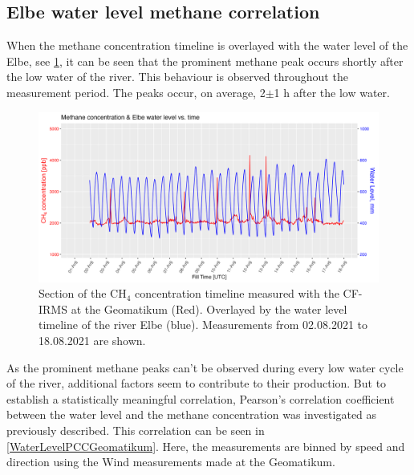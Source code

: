 \subsection{Elbe water level methane correlation} \label{MethaneWaterLevel}
When the methane concentration timeline is overlayed with the water level of the Elbe, see \cref{TimelineCH4Waterlevel}, it can be seen that the prominent methane peak occurs shortly after the low water of the river. This behaviour is observed throughout the measurement period. The peaks occur, on average, 2$\pm$1 h after the low water.
\begin{figure}[htbp]
 \centering
 \includegraphics[width=1\textwidth]{figures/Appendix/Water_Level/1_CH4_WL.png}
 \caption[CH$_4$ Timeline with Elbe Water level Overlay]{Section of the CH$_4$ concentration timeline measured with the CF-IRMS at the Geomatikum (Red). Overlayed by the water level timeline of the river Elbe (blue). Measurements from 02.08.2021 to 18.08.2021 are shown.}
 \label{TimelineCH4Waterlevel}
\end{figure}
As the prominent methane peaks can’t be observed during every low water cycle of the river, additional factors seem to contribute to their production. But to establish a statistically meaningful correlation, Pearson's correlation coefficient between the water level and the methane concentration was investigated as previously described.
This correlation can be seen in  \cref{WaterLevelPCCGeomatikum}. Here, the measurements are binned by speed and direction using the Wind measurements made at the Geomatikum.
